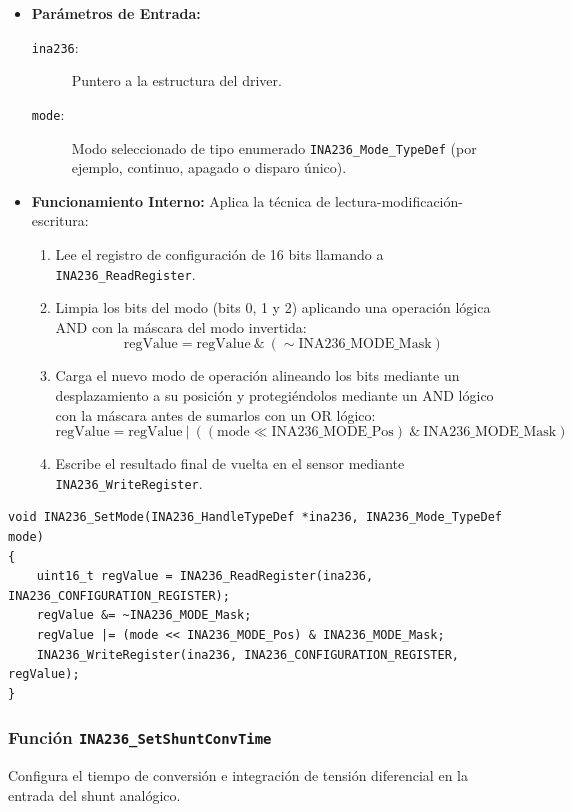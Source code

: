 \documentclass[
10pt, %
a4paper, %
oneside, %
headinclude,footinclude, %
BCOR5mm, %
]{scrartcl}
\begin{document}
\begin{itemize}
	\item \textbf{Parámetros de Entrada:}
		\begin{description}
			\item[\texttt{ina236}:] Puntero a la estructura del driver.
			\item[\texttt{mode}:] Modo seleccionado de tipo enumerado \texttt{INA236\_Mode\_TypeDef} (por ejemplo, continuo, apagado o disparo único).
		\end{description}
	\item \textbf{Funcionamiento Interno:}
		Aplica la técnica de lectura-modificación-escritura:
		\begin{enumerate}
			\item Lee el registro de configuración de 16 bits llamando a \texttt{INA236\_ReadRegister}.
			\item Limpia los bits del modo (bits 0, 1 y 2) aplicando una operación lógica AND con la máscara del modo invertida:
				\begin{equation}
					\text{regValue} = \text{regValue} \ \& \ (\sim\text{INA236\_MODE\_Mask})
				\end{equation}
			\item Carga el nuevo modo de operación alineando los bits mediante un desplazamiento a su posición y protegiéndolos mediante un AND lógico con la máscara antes de sumarlos con un OR lógico:
				\begin{equation}
					\text{regValue} = \text{regValue} \ | \ ((\text{mode} \ll \text{INA236\_MODE\_Pos}) \ \& \ \text{INA236\_MODE\_Mask})
				\end{equation}
			\item Escribe el resultado final de vuelta en el sensor mediante \texttt{INA236\_WriteRegister}.
		\end{enumerate}
\end{itemize}

\begin{lstlisting}[style=CMakeStyle]
void INA236_SetMode(INA236_HandleTypeDef *ina236, INA236_Mode_TypeDef mode)
{
    uint16_t regValue = INA236_ReadRegister(ina236, INA236_CONFIGURATION_REGISTER);
    regValue &= ~INA236_MODE_Mask;
    regValue |= (mode << INA236_MODE_Pos) & INA236_MODE_Mask;
    INA236_WriteRegister(ina236, INA236_CONFIGURATION_REGISTER, regValue);
}
\end{lstlisting}

\subsubsection{Función \texttt{INA236\_SetShuntConvTime}}
Configura el tiempo de conversión e integración de tensión diferencial en la entrada del shunt analógico.
\end{document}
